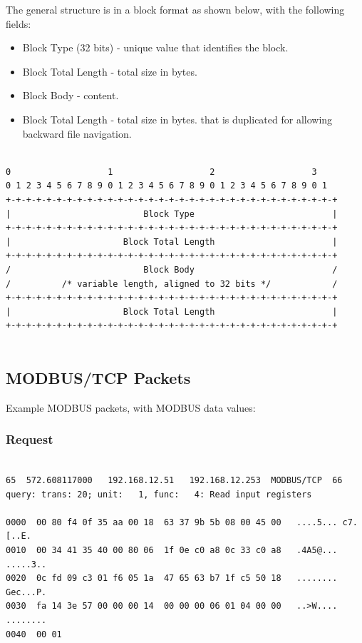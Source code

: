 \documentclass[11pt,a4paper]{article}
\begin{document}
The general structure is in a block format as shown below, with the
following fields:

\begin{itemize}
\itemsep1pt\parskip0pt
\item
  Block Type (32 bits) - unique value that identifies the block.
\item
  Block Total Length - total size in bytes.
\item
  Block Body - content.
\item
  Block Total Length - total size in bytes. that is duplicated for
  allowing backward file navigation.
\end{itemize}

\newpage

\begin{verbatim}

0                   1                   2                   3
0 1 2 3 4 5 6 7 8 9 0 1 2 3 4 5 6 7 8 9 0 1 2 3 4 5 6 7 8 9 0 1
+-+-+-+-+-+-+-+-+-+-+-+-+-+-+-+-+-+-+-+-+-+-+-+-+-+-+-+-+-+-+-+-+
|                          Block Type                           |
+-+-+-+-+-+-+-+-+-+-+-+-+-+-+-+-+-+-+-+-+-+-+-+-+-+-+-+-+-+-+-+-+
|                      Block Total Length                       |
+-+-+-+-+-+-+-+-+-+-+-+-+-+-+-+-+-+-+-+-+-+-+-+-+-+-+-+-+-+-+-+-+
/                          Block Body                           /
/          /* variable length, aligned to 32 bits */            /
+-+-+-+-+-+-+-+-+-+-+-+-+-+-+-+-+-+-+-+-+-+-+-+-+-+-+-+-+-+-+-+-+
|                      Block Total Length                       |
+-+-+-+-+-+-+-+-+-+-+-+-+-+-+-+-+-+-+-+-+-+-+-+-+-+-+-+-+-+-+-+-+    
    
\end{verbatim}

\subsection{MODBUS/TCP Packets}\label{modbustcp-packets}

Example MODBUS packets, with MODBUS data values:

\subsubsection{Request}\label{request}

\begin{verbatim}

65  572.608117000   192.168.12.51   192.168.12.253  MODBUS/TCP  66
query: trans: 20; unit:   1, func:   4: Read input registers

0000  00 80 f4 0f 35 aa 00 18  63 37 9b 5b 08 00 45 00   ....5... c7.[..E.
0010  00 34 41 35 40 00 80 06  1f 0e c0 a8 0c 33 c0 a8   .4A5@... .....3..
0020  0c fd 09 c3 01 f6 05 1a  47 65 63 b7 1f c5 50 18   ........ Gec...P.
0030  fa 14 3e 57 00 00 00 14  00 00 00 06 01 04 00 00   ..>W.... ........
0040  00 01    
    
\end{verbatim}
\end{document}
